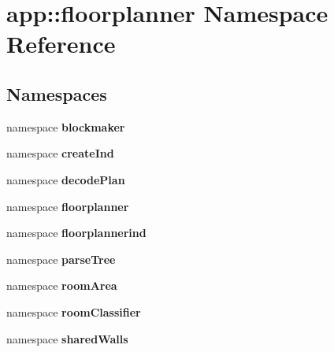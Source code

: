 \section{app::floorplanner Namespace Reference}
\label{namespaceapp_1_1floorplanner}


\subsection*{Namespaces}
\begin{CompactItemize}
\item 
namespace {\bf blockmaker}
\item 
namespace {\bf createInd}
\item 
namespace {\bf decodePlan}
\item 
namespace {\bf floorplanner}
\item 
namespace {\bf floorplannerind}
\item 
namespace {\bf parseTree}
\item 
namespace {\bf roomArea}
\item 
namespace {\bf roomClassifier}
\item 
namespace {\bf sharedWalls}
\end{CompactItemize}

